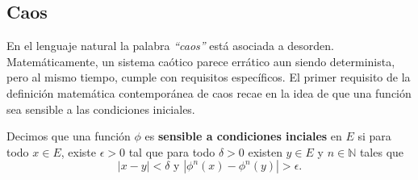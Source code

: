 \documentclass[../Main.tex]{subfiles}
\begin{document}
\subsection{Caos}
    En el lenguaje natural la palabra \textit{``caos''} está asociada a desorden. Matemáticamente, un sistema caótico parece errático aun siendo determinista, pero al mismo tiempo, cumple con requisitos específicos. El primer requisito de la definición matemática contemporánea de caos recae en la idea de que una función sea sensible a las condiciones iniciales.
\begin{definition} 
    Decimos que una función $\phi$ es \textbf{sensible a condiciones inciales} en $E$ si para todo $x\in E$, existe $\epsilon >0$ tal que para todo $\delta >0$ existen $y\in E$ y $n\in \mathbb{N}$ tales que \[|x-y|<\delta \text{ y }|\phi^n(x)-\phi^n(y)|>\epsilon.\]
\end{definition}

\end{document}
